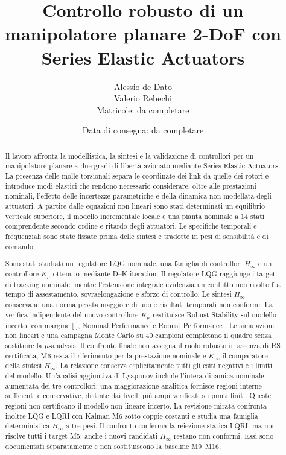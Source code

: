 \documentclass[11pt,a4paper,oneside]{report}
\title{Controllo robusto di un manipolatore planare 2-DoF con Series Elastic Actuators}
\author{Alessio de Dato \\ Valerio Rebechi \\[0.8em]\small Matricole: da completare}
\date{Data di consegna: da completare}
\newcommand{\status}[1]{\texttt{#1}}
\begin{document}
\hypersetup{pageanchor=false}
\maketitle
\hypersetup{pageanchor=true}
\begin{abstract}
Il lavoro affronta la modellistica, la sintesi e la validazione di controllori per un manipolatore planare a due gradi di libertà azionato mediante Series Elastic Actuators. La presenza delle molle torsionali separa le coordinate dei link da quelle dei rotori e introduce modi elastici che rendono necessario considerare, oltre alle prestazioni nominali, l'effetto delle incertezze parametriche e della dinamica non modellata degli attuatori. A partire dalle equazioni non lineari sono stati determinati un equilibrio verticale superiore, il modello incrementale locale e una pianta nominale a 14 stati comprendente secondo ordine e ritardo degli attuatori. Le specifiche temporali e frequenziali sono state fissate prima delle sintesi e tradotte in pesi di sensibilità e di comando.

Sono stati studiati un regolatore LQG nominale, una famiglia di controllori $H_\infty$ e un controllore $K_\mu$ ottenuto mediante D--K iteration. Il regolatore LQG raggiunge i target di tracking nominale, mentre l'estensione integrale evidenzia un conflitto non risolto fra tempo di assestamento, sovraelongazione e sforzo di controllo. Le sintesi $H_\infty$ conservano una norma pesata maggiore di uno e risultati temporali non conformi. La verifica indipendente del nuovo controllore $K_\mu$ restituisce Robust Stability \status{\KmuRSStatus} sul modello incerto, con margine [\KmuRSLower,\KmuRSUpper], Nominal Performance \status{\KmuNPStatus} e Robust Performance \status{\KmuRPStatus}. Le simulazioni non lineari e una campagna Monte Carlo su 40 campioni completano il quadro senza sostituire la $\mu$-analysis. Il confronto finale non assegna il ruolo robusto in assenza di RS certificata; M6 resta il riferimento per la prestazione nominale e $K_{\infty}$ il comparatore della sintesi $H_\infty$. La relazione conserva esplicitamente tutti gli esiti negativi e i limiti del modello.
Un'analisi aggiuntiva di Lyapunov include l'intera dinamica nominale aumentata
dei tre controllori: una maggiorazione analitica fornisce regioni interne
sufficienti e conservative, distinte dai livelli pi\`u ampi verificati su
punti finiti. Queste regioni non certificano il modello non lineare incerto.
La revisione mirata confronta inoltre LQG e LQRI con Kalman M6 sotto coppie costanti e
studia una famiglia deterministica $H_\infty$ a tre pesi. Il confronto
conferma la reiezione statica LQRI, ma non risolve tutti i target M5;
anche i nuovi candidati $H_\infty$ restano non conformi. Essi sono
documentati separatamente e non sostituiscono la baseline M9--M16.
\end{abstract}
\end{document}
